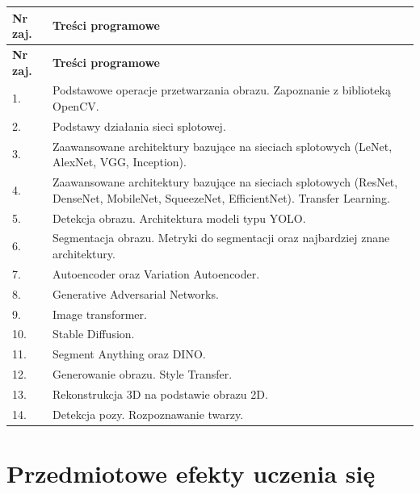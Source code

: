 \documentclass[12pt, a4paper]{article}
\newcommand{\thdrule}{\noalign{\global\setlength{\extrarowheight}{0pt}}}
\newcommand{\thdend}{\noalign{\global\setlength{\extrarowheight}{3pt}}}
\begin{document}
{\scriptsize
\begin{longtable}{m{1.5cm}m{14.5cm}}
\thdrule\toprule
\rowcolor{pjatkRed} {\color{white}\textbf{Nr zaj.}} & {\color{white}\textbf{Treści programowe}} \\
\midrule\thdend
\endfirsthead
\thdrule\toprule
\rowcolor{pjatkRed} {\color{white}\textbf{Nr zaj.}} & {\color{white}\textbf{Treści programowe}} \\
\midrule\thdend
\endhead
  \rowcolor{tableRowLight} 1. & Podstawowe operacje przetwarzania obrazu. Zapoznanie z biblioteką OpenCV. \\
  \rowcolor{tableRowAlt} 2. & Podstawy działania sieci splotowej. \\
  \rowcolor{tableRowLight} 3. & Zaawansowane architektury bazujące na sieciach splotowych (LeNet, AlexNet, VGG, Inception). \\
  \rowcolor{tableRowAlt} 4. & Zaawansowane architektury bazujące na sieciach splotowych (ResNet, DenseNet, MobileNet, SqueezeNet, EfficientNet). Transfer Learning. \\
  \rowcolor{tableRowLight} 5. & Detekcja obrazu. Architektura modeli typu YOLO. \\
  \rowcolor{tableRowAlt} 6. & Segmentacja obrazu. Metryki do segmentacji oraz najbardziej znane architektury. \\
  \rowcolor{tableRowLight} 7. & Autoencoder oraz Variation Autoencoder. \\
  \rowcolor{tableRowAlt} 8. & Generative Adversarial Networks. \\
  \rowcolor{tableRowLight} 9. & Image transformer. \\
  \rowcolor{tableRowAlt} 10. & Stable Diffusion. \\
  \rowcolor{tableRowLight} 11. & Segment Anything oraz DINO. \\
  \rowcolor{tableRowAlt} 12. & Generowanie obrazu. Style Transfer. \\
  \rowcolor{tableRowLight} 13. & Rekonstrukcja 3D na podstawie obrazu 2D. \\
  \rowcolor{tableRowAlt} 14. & Detekcja pozy. Rozpoznawanie twarzy. \\
\bottomrule
\end{longtable}}

\section{Przedmiotowe efekty uczenia się}
\end{document}

